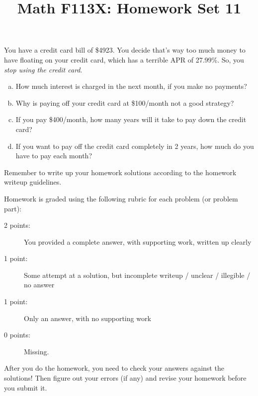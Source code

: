 \documentclass[11pt, oneside]{article}   	%
\title{Math F113X: Homework Set 11}
\date{}							%
\begin{document}
\maketitle

\vspace{-1.5cm}



 You have a credit card bill of \$4923. You decide that's way too much money to have floating on your credit card, which has a terrible APR of 27.99\%. So, you \emph{stop using the credit card}.

\begin{enumerate}[(a)]
\item How much interest is charged in the next month, if you make no payments?
\item Why is paying off your credit card at \$100/month not a good strategy?
\item If you pay \$400/month, how many years will it take to pay down the credit card?
\item If you want to pay off the credit card completely in 2 years, how much do you have to pay each month?
\end{enumerate}

\hrulefill

Remember to write up your homework solutions according to the homework writeup guidelines. 

Homework is graded using the following rubric for each problem (or problem part):

\begin{description}
\item[2 points:] You provided a complete answer, with supporting work, written up clearly
\item[1 point:] Some attempt at a solution, but incomplete writeup / unclear / illegible / no answer
\item[1 point:] Only an answer, with no supporting work 
\item[0 points:] Missing.
\end{description}

After you do the homework, you need to check your answers against the solutions! Then figure out your errors (if any) and revise your homework before you submit it. 
\end{document}
